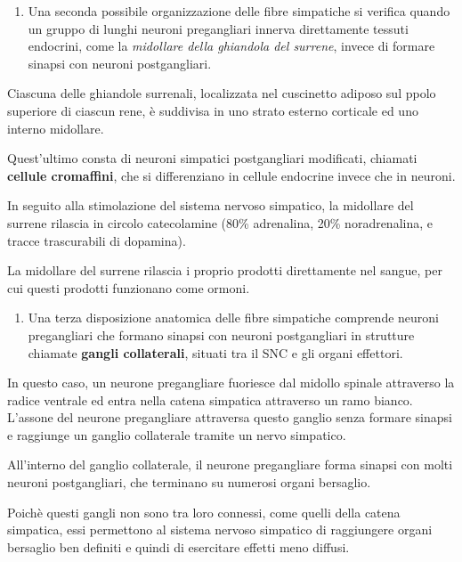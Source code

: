\documentclass[]{article}
\begin{document}
\begin{enumerate}
\def\labelenumi{\arabic{enumi}.}
\setcounter{enumi}{1}
\itemsep1pt\parskip0pt
\item
  Una seconda possibile organizzazione delle fibre simpatiche si
  verifica quando un gruppo di lunghi neuroni pregangliari innerva
  direttamente tessuti endocrini, come la \emph{midollare della
  ghiandola del surrene}, invece di formare sinapsi con neuroni
  postgangliari.
\end{enumerate}

Ciascuna delle ghiandole surrenali, localizzata nel cuscinetto adiposo
sul ppolo superiore di ciascun rene, è suddivisa in uno strato esterno
corticale ed uno interno midollare.

Quest'ultimo consta di neuroni simpatici postgangliari modificati,
chiamati \textbf{cellule cromaffini}, che si differenziano in cellule
endocrine invece che in neuroni.

In seguito alla stimolazione del sistema nervoso simpatico, la midollare
del surrene rilascia in circolo catecolamine (80\% adrenalina, 20\%
noradrenalina, e tracce trascurabili di dopamina).

La midollare del surrene rilascia i proprio prodotti direttamente nel
sangue, per cui questi prodotti funzionano come ormoni.

\begin{enumerate}
\def\labelenumi{\arabic{enumi}.}
\setcounter{enumi}{2}
\itemsep1pt\parskip0pt
\item
  Una terza disposizione anatomica delle fibre simpatiche comprende
  neuroni pregangliari che formano sinapsi con neuroni postgangliari in
  strutture chiamate \textbf{gangli collaterali}, situati tra il SNC e
  gli organi effettori.
\end{enumerate}

In questo caso, un neurone pregangliare fuoriesce dal midollo spinale
attraverso la radice ventrale ed entra nella catena simpatica attraverso
un ramo bianco. L'assone del neurone pregangliare attraversa questo
ganglio senza formare sinapsi e raggiunge un ganglio collaterale tramite
un nervo simpatico.

All'interno del ganglio collaterale, il neurone pregangliare forma
sinapsi con molti neuroni postgangliari, che terminano su numerosi
organi bersaglio.

Poichè questi gangli non sono tra loro connessi, come quelli della
catena simpatica, essi permettono al sistema nervoso simpatico di
raggiungere organi bersaglio ben definiti e quindi di esercitare effetti
meno diffusi.
\end{document}
